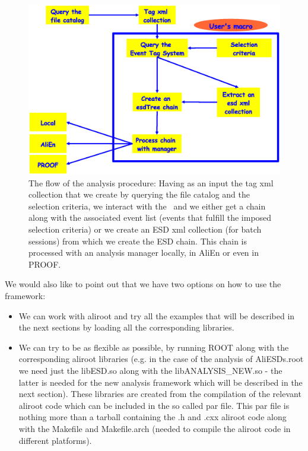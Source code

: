 \begin{figure}[ht!]
\begin{center}
\includegraphics[width=0.7\textheight]{figures/Flow.eps}
\end{center}
\caption{The flow of the analysis procedure: Having as an input the tag xml collection that we create by querying the file catalog and the selection criteria, we interact with the \tag\ and we either get a chain along with the associated event list (events that fulfill the imposed selection criteria) or we create an ESD xml collection (for batch sessions) from which we create the ESD chain. This chain is processed with an analysis manager locally, in AliEn or even in PROOF.}
\label{Note:FigAnalysisFlow}
\end{figure}

We would also like to point out that we have two options on how to use the framework:

\begin{itemize}
\item We can work with aliroot and try all the examples that will be described in the next sections by loading all the corresponding libraries.
\item We can try to be as flexible as possible, by running ROOT along with the corresponding aliroot libraries (e.g. in the case of the analysis of AliESDs.root we need just the libESD.so along with the libANALYSIS\_NEW.so - the latter is needed for the new analysis framework which will be described in the next section). These libraries are created from the compilation of the relevant aliroot code which can be included in the so called {\ttfamily par file}. This par file is nothing more than a tarball containing the .h and .cxx aliroot code along with the Makefile and Makefile.arch (needed to compile the aliroot code in different platforms).
\end{itemize}

